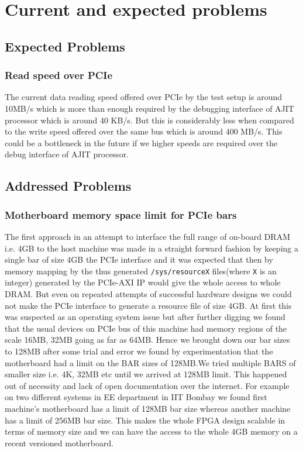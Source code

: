 \chapter{Current and expected problems}

\section{Expected Problems}

\subsection{Read speed over PCIe}

The current data reading speed offered over PCIe by the test setup is around 10MB/s which is more than enough required by the debugging
interface of AJIT processor which is around 40 KB/s. But this is considerably less when compared to the write speed offered over the same
bus which is around 400 MB/s. This could be a bottleneck in the future if we higher speeds are required over the debug interface of AJIT
processor.

\section{Addressed Problems}

\subsection{Motherboard memory space limit for PCIe bars}

The first approach in an attempt to interface the full range of on-board DRAM i.e. 4GB to the host machine was made in a straight forward
fashion by keeping a single bar of size 4GB the PCIe interface and it was expected that then by memory mapping by the thus generated
\verb|/sys/resourceX| files(where \verb|X| is an integer) generated by the PCIe-AXI IP would give the whole access to whole DRAM. But even
on repeated attempts of successful hardware designs we could not make the PCIe interface to generate a resource file of size 4GB. At first
this was suspected as an operating system issue but after further digging we found that the usual devices on PCIe bus of this machine had
memory regions of the scale 16MB, 32MB going as far as 64MB. Hence we brought down our bar sizes to 128MB after some trial and error we
found by experimentation that the motherboard had a limit on the BAR sizes of 128MB.We tried multiple BARS of smaller size i.e. 4K, 32MB etc
until we arrived at 128MB limit. This happened out of necessity and lack of open documentation over the internet. For example on two
different systems in EE department in IIT Bombay we found first machine's motherboard has a limit of 128MB bar size whereas another machine
has a limit of 256MB bar size. This makes the whole FPGA design scalable in terms of memory size and we can have the access to the whole 4GB
memory on a recent versioned motherboard.

